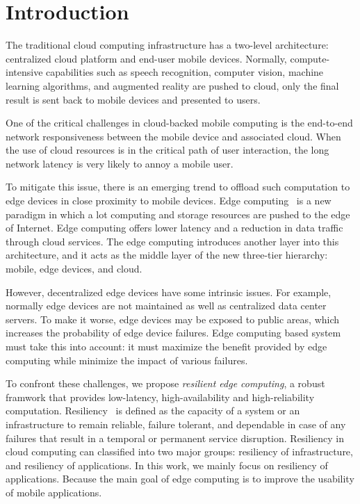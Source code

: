 \section{Introduction}
The traditional cloud computing infrastructure has a two-level
architecture: centralized cloud platform and end-user mobile devices.
Normally, compute-intensive capabilities such as speech recognition,
computer vision, machine learning algorithms, and augmented reality
are pushed to cloud, only the final result is sent back to mobile
devices and presented to users.

One of the critical challenges in cloud-backed mobile computing
is the end-to-end network responsiveness between the mobile device
and associated cloud. When the use of cloud resources is in the
critical path of user interaction, the long network latency is very
likely to annoy a mobile user.

To mitigate this issue, there is an emerging trend to offload
such computation to edge devices in close proximity to mobile devices.
Edge computing~\cite{url:openedgecomputing,edge-computing} is a new paradigm in which a lot computing and storage
resources are pushed to the edge of Internet. Edge computing offers
lower latency and a reduction in data traffic through cloud services.
The edge computing introduces another layer into this architecture, and it acts as the
middle layer of the new three-tier hierarchy: mobile, edge devices, and cloud.

However, decentralized edge devices have some intrinsic issues.
For example, normally edge devices are not maintained as well
as centralized data center servers. To make it worse, edge devices
may be exposed to public areas, which increases the probability
of edge device failures. Edge computing based system must take this
into account: it must maximize the benefit provided by edge computing while
minimize the impact of various failures.

To confront these challenges, we propose {\em resilient edge computing}, a robust framwork that provides
low-latency, high-availability and high-reliability computation.
Resiliency~\cite{Resiliency-survey} is defined as the capacity of
a system or an infrastructure to remain reliable, failure tolerant, and dependable
in case of any failures that result in a temporal or permanent service disruption.
Resiliency in cloud computing can classified into two major groups: resiliency of
infrastructure, and resiliency of applications. In this work, we mainly focus
on resiliency of applications. Because the main goal of edge computing is to improve
the usability of mobile applications.


